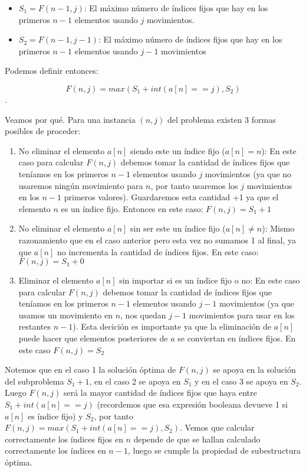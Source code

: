 \documentclass[11pt]{article}
\begin{document}
    \begin{itemize}
        \item $S_1 = F(n-1, j)$: El máximo número de índices fijos que hay en los primeros $n-1$ elementos
              usando $j$ movimientos.
        \item $S_2 = F(n-1, j-1)$: El máximo número de índices fijos que hay en los primeros $n-1$ elementos
              usando $j-1$ movimientos
    \end{itemize}

    Podemos definir entonces:

    \[
    F(n, j) = max(S_1 + int(a[n] == j), S_2)
    \]. 
    
    Veamos por qué. Para una instancia $(n, j)$ del problema existen 3 formas posibles de proceder:

    \begin{enumerate}
        \item No eliminar el elemento $a[n]$ siendo este un índice fijo ($a[n] = n$): En este caso para calcular
              $F(n, j)$ debemos tomar la cantidad de índices fijos que teníamos en los primeros $n-1$ elementos 
               usando $j$ movimientos (ya que no usaremos ningún movimiento para $n$, por tanto usaremos los $j$ 
               movimientos en los $n-1$ primeros valores). Guardaremos esta cantidad +1 ya que el elemento $n$ es 
               un índice fijo. Entonces en este caso: $F(n, j) = S_1 + 1$
        \item No eliminar el elemento $a[n]$ sin ser este un índice fijo ($a[n] \ne n$): Mismo razonamiento que en el caso
              anterior pero esta vez no sumamos 1 al final, ya que $a[n]$ no incrementa la cantidad de índices fijos.
              En este caso: $F(n, j) = S_1 + 0$
        \item Eliminar el elemento $a[n]$ sin importar si es un índice fijo o no: En este caso para calcular
              $F(n, j)$ debemos tomar la cantidad de índices fijos que teníamos en los primeros $n-1$ elementos
              usando $j-1$ movimientos (ya que usamos un movimiento en $n$, nos quedan $j-1$ movimientos para
              usar en los restantes $n-1$). Esta decición es importante ya que la eliminación de $a[n]$ puede hacer
              que elementos posteriores de $a$ se conviertan en índices fijos. En este caso $F(n, j) = S_2$
    \end{enumerate}

    Notemos que en el caso 1 la solución óptima de $F(n, j)$ se apoya en la solución del subproblema $S_1 + 1$, en el
    caso 2 se apoya en $S_1$ y en el caso 3 se apoya en $S_2$. Luego $F(n, j)$ será la mayor cantidad de índices fijos
    que haya entre $S_1 + int(a[n] == j)$ (recordemos que esa expresión booleana devueve 1 si $a[n]$ es índice fijo) y 
    $S_2$, por tanto $F(n, j) = max(S_1 + int(a[n] == j), S_2)$. Vemos que calcular correctamente los índices fijos en $n$ 
    depende de que se hallan calculado correctamente los índices en $n-1$, luego se cumple la propiedad de subestructura óptima.
    
\end{document}
